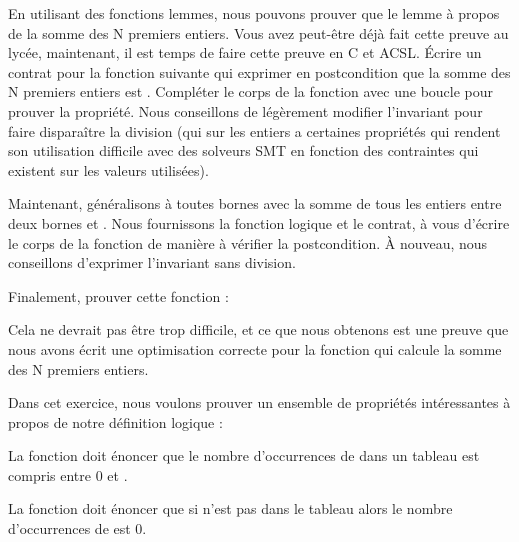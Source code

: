 



En utilisant des fonctions lemmes, nous pouvons prouver que le lemme à
propos de la somme des N premiers entiers. Vous avez peut-être déjà fait cette
preuve au lycée, maintenant, il est temps de faire cette preuve en C et ACSL.
Écrire un contrat pour la fonction suivante qui exprimer en postcondition que la
somme des N premiers entiers est . Compléter le corps de la
fonction avec une boucle pour prouver la propriété. Nous conseillons de légèrement
modifier l'invariant pour faire disparaître la division (qui sur les entiers a
certaines propriétés qui rendent son utilisation difficile avec des solveurs SMT
en fonction des contraintes qui existent sur les valeurs utilisées).




Maintenant, généralisons à toutes bornes avec la somme de tous les entiers entre
deux bornes  et . Nous fournissons la fonction
logique et le contrat, à vous d'écrire le corps de la fonction de manière à vérifier
la postcondition. À nouveau, nous conseillons d'exprimer l'invariant sans division.




Finalement, prouver cette fonction :




Cela ne devrait pas être trop difficile, et ce que nous obtenons est une preuve
que nous avons écrit une optimisation correcte pour la fonction qui calcule la
somme des N premiers entiers.




Dans cet exercice, nous voulons prouver un ensemble de propriétés intéressantes
à propos de notre définition logique  :




La fonction  doit énoncer que le nombre d'occurrences
de  dans un tableau est compris entre 0 et .


La fonction  doit énoncer que si 
n'est pas dans le tableau alors le nombre d'occurrences de  est 0.


